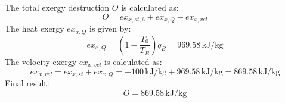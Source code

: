 The total exergy destruction \( O \) is calculated as:  
\[
O = ex_{x,st,6} + ex_{x,Q} - ex_{x,vel}
\]  
The heat exergy \( ex_{x,Q} \) is given by:  
\[
ex_{x,Q} = \left(1 - \frac{T_0}{T_B}\right) q_B = 969.58 \, \text{kJ/kg}
\]  
The velocity exergy \( ex_{x,vel} \) is calculated as:  
\[
ex_{x,vel} = ex_{x,st} + ex_{x,Q} = -100 \, \text{kJ/kg} + 969.58 \, \text{kJ/kg} = 869.58 \, \text{kJ/kg}
\]  
Final result:  
\[
O = 869.58 \, \text{kJ/kg}
\]